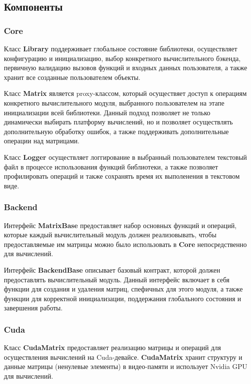 \subsection{Компоненты}

\subsubsection*{Core}

Класс \textbf{Library} поддерживает глобальное состояние библиотеки, осуществляет конфигурацию и инициализацию, выбор конкретного вычислительного бэкенда, первичную валидацию вызовов функций и входных данных пользователя, 
а также хранит все созданные пользователем объекты. 

Класс \textbf{Matrix} является proxy-классом, который осуществяет доступ к операциям конкретного вычислительного модуля, выбранного пользователем на этапе инициализации всей библиотеки.
Данный подход позволяет не только динамически выбирать платформу вычислений, 
но и позволяет осуществлять дополнительную обработку ошибок, 
а также поддерживать дополнительные операции над матрицами.

Класс \textbf{Logger} осуществляет логгирование в выбранный пользователем текстовый файл в процессе использования функций библиотеки, а также позволяет профилировать операций и также сохранять время их выполенения в текстовом виде.

\subsubsection*{Backend}

Интерфейс \textbf{MatrixBase} предоставляет набор основных функций и операций, которые каждый вычислительный модуль должен реализовывать, чтобы предоставляемые им матрицы можно было использовать в \textbf{Core} непосредственно для вычислений.

Интерфейс \textbf{BackendBase} описывает базовый контракт, которой должен предоставлять вычислительный модуль. Данный интерфейс включает в себя функции для создания и удаления матриц, спефичных для этого модуля, а также функции для корректной инициализации, поддержания глобального состояния и завершения работы.

\subsubsection*{Cuda}

Класс \textbf{CudaMatrix} предоставляет реализацию матрицы и операций для осуществления вычислений на Cuda-девайсе. \textbf{CudaMatrix} хранит структуру и данные матрицы (ненулевые элементы) в видео-памяти и использует Nvidia GPU для вычислений.

